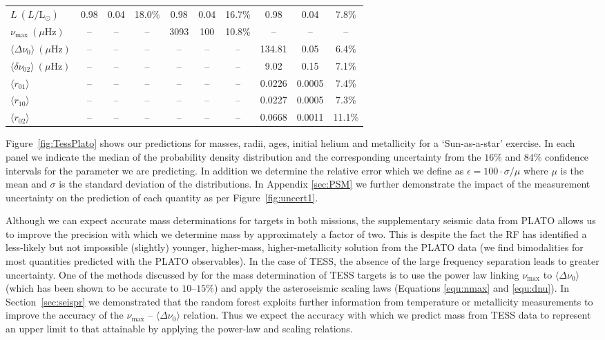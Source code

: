 {\begin{landscape}
\begin{table}
\begin{tabular}{l|ccc|ccc|ccc}
$L \ (L/\text{L}_{\odot})$   &0.98  &0.04 &18.0\% &0.98  &0.04  &16.7\% &0.98  &0.04  &7.8\%\\
$\nu_{\max} \ (\mu \text{Hz})$  & -- & -- & -- &3093 &100 &10.8\% & -- &-- & --\\
$\langle\Delta\nu_0\rangle  \ (\mu \text{Hz})$  & -- & -- & -- & -- & -- & -- &134.81 &0.05 &6.4\%\\
$\langle\delta\nu_{02}\rangle  \ (\mu \text{Hz})$  & -- & -- & -- & -- & -- & -- &9.02 &0.15 &7.1\% \\
$\langle r_{01}\rangle$ & -- & -- & -- & -- & -- & -- &0.0226 &0.0005 &7.4\%\\
$\langle r_{10}\rangle$ & -- & -- & -- & -- & -- & -- &0.0227 &0.0005 &7.3\% \\
$\langle r_{02}\rangle$& -- & -- & -- & -- & -- & -- &0.0668 &0.0011 & 11.1\%
\end{tabular}
\end{table}
\end{landscape}
}


Figure~\ref{fig:TessPlato} shows our predictions for masses, radii, ages, initial helium and metallicity for a `Sun-as-a-star' exercise. In each panel we indicate the median of the probability density distribution and the corresponding  uncertainty from the $16\%$ and $84\%$ confidence intervals for the parameter we are predicting. In addition we determine the relative error which we define as ${\epsilon = 100 \cdot \sigma/\mu}$  where $\mu$ is the mean and $\sigma$ is the standard deviation of the distributions. In Appendix \ref{sec:PSM} we further demonstrate the impact of the measurement uncertainty on the prediction of each quantity as per Figure~\ref{fig:uncert1}.


Although we can expect accurate mass determinations for targets in both missions, the supplementary seismic data from PLATO allows us to improve the precision with which we determine mass by approximately a factor of two. This is despite the fact the RF has identified a less-likely but not impossible (slightly) younger, higher-mass, higher-metallicity solution from the  PLATO  data (we find bimodalities for most quantities predicted with the PLATO observables). In the case of TESS, the absence of the large frequency separation leads to greater uncertainty. One of the methods discussed  by \citet{2016ApJ...830..138C} for the mass determination of TESS targets is to use the power law linking $\nu_{\max}$ to ${\langle\Delta\nu_0\rangle}$ (which has been shown to be accurate to $10$--$15\%$) and apply the asteroseismic scaling laws (Equations \ref{equ:nmax} and \ref{equ:dnu}).  In Section~\ref{sec:seispr} we demonstrated that the random forest exploits further information from  temperature or metallicity measurements to improve the accuracy of the $\nu_{\max}$ -- ${\langle\Delta\nu_0\rangle}$ relation.  Thus we expect the accuracy with which we predict mass from TESS data to represent an upper limit to that attainable by  applying the power-law and scaling relations. 

